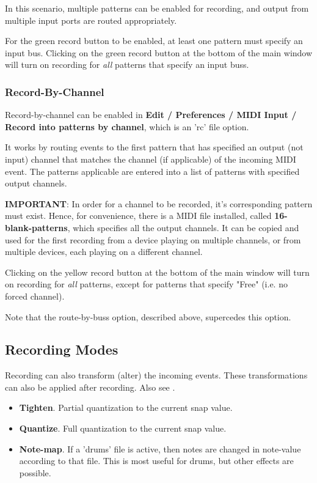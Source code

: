    In this scenario, multiple patterns can be enabled for recording,
   and output from multiple input ports are routed appropriately.

   For the green record button to be enabled, at least one pattern
   must specify an input bus.
   Clicking on the green record button at the bottom of the main window
   will turn on recording for \textsl{all}
   patterns that specify an input buss.

\subsubsection{Record-By-Channel}
\label{subsubsec:recording_record_by_channel}

   Record-by-channel can be enabled in
   \textbf{Edit / Preferences / MIDI Input / Record into patterns by
   channel}, which is an 'rc' file option.

   It works by routing events to the first pattern that has specified an 
   output (not input) channel that matches the channel (if applicable) of
   the incoming MIDI event.
   The patterns applicable are entered into a list of patterns with specified
   output channels.

   \textbf{IMPORTANT}:
   In order for a channel to be recorded, it's corresponding pattern
   must exist. Hence,
   for convenience, there is a MIDI file installed, called
   \textbf{16-blank-patterns}, which specifies all the output channels.
   It can be copied and used for the first recording from a device
   playing on multiple channels, or from multiple devices, each playing
   on a different channel.

   Clicking on the yellow record button at the bottom of the main window
   will turn on recording for \textsl{all}
   patterns, except for patterns that specify "Free" (i.e. no forced channel).

   Note that the route-by-buss option, described above, supercedes this
   option.

\subsection{Recording Modes}
\label{sec:recording_modes}

   Recording can also transform (alter) the incoming events.
   These transformations can also be applied after recording.
   Also see .

   \begin{itemize}
      \item \textbf{Tighten}.
         Partial quantization to the current snap value.
      \item \textbf{Quantize}.
         Full quantization to the current snap value.
      \item \textbf{Note-map}.
         If a 'drums' file is active, then notes are changed
         in note-value according to that file.
         This is most useful for drums, but other effects are possible.
   \end{itemize}


